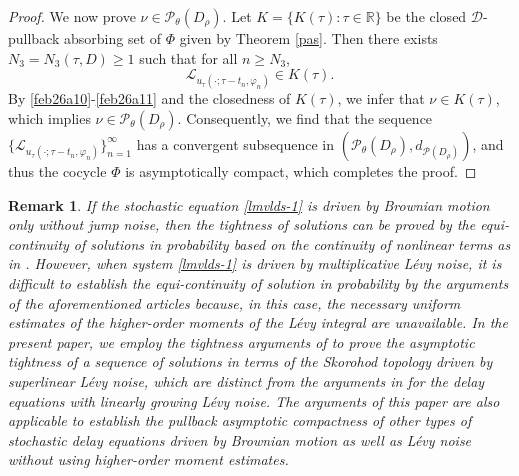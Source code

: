\documentclass[11pt]{article}
\numberwithin{equation}{section}
\theoremstyle{plain}
\newtheorem{remark}{Remark}[section]
\newcommand{\R}{\mathbb{R}}
\def \cald {{  {\mathcal{D}}  }}
\def\be{\begin{equation}}
\def\ee{\end{equation}}
\begin{document}
\begin{proof}
We now prove   $\nu \in \mathcal{P}_\theta (D_\rho)$.
 Let $K=\{K(\tau): \tau \in \R \}$
 be the closed $\cald$-pullback
 absorbing set of $\Phi$ given by 
 Theorem \ref{pas}.
  Then there exists
 $N_3=N_3 (\tau, D) \ge 1$ such that for all
 $n\ge N_3$,
 \be\label{feb26a11}
 \mathcal{L}_{  u_\tau (\cdot; \tau -t_n, \varphi_n)}
 \in  K(\tau).
\ee
By \eqref{feb26a10}-\eqref{feb26a11}
and the closedness of 
 $K(\tau)$,   we infer that 
  $\nu \in K(\tau)$,
  which implies 
 $\nu \in \mathcal{P}_\theta (D_\rho)$.
Consequently, we find that
the sequence
$\{\mathcal{L}_{
       u _\tau  ( \cdot; \tau - t_n,  \varphi_n   )  }
       \}_{n=1}^\infty$
       has a convergent subsequence
       in  $(\mathcal{P}_{\theta}(D_{\rho}), d_{\mathcal{P}(D_{\rho})})$,
       and thus the cocycle $\Phi$
       is asymptotically compact,
       which completes the proof.
 \end{proof}





  
 \begin{remark}
   If the stochastic equation
    \eqref{lmvlds-1} is   driven by Brownian motion
    only without jump noise, 
    then the tightness of solutions can be 
    proved  by the equi-continuity 
    of solutions in probability
    based on 
    the  continuity 
    of nonlinear terms 
     as in \cite{CWZ2025JNS, wwm2019SCL, ll2022DCDSB, csw2025PRSEA}. 
     However, 
    when  system  \eqref{lmvlds-1} 
    is driven by  multiplicative L\'{e}vy noise,
    it is difficult
    to establish the equi-continuity 
    of solution in probability
    by 
  the arguments
  of the aforementioned articles
  because, in this case,
  the necessary
  uniform estimates
  of the  higher-order moments of 
  the L\'{e}vy integral are unavailable.
   In the present paper,
   we employ  the tightness
   arguments of  \cite{J1986AIHP, A1978AOP} to 
   prove the asymptotic
   tightness of  a sequence of solutions in
   terms of the  Skorohod
   topology    driven by superlinear L\'{e}vy noise, 
  which  are   distinct from 
  the arguments  in \cite{RRG2006SPA, bc2016Stoch} 
  for the  delay   equations with linearly
  growing   L\'{e}vy noise. 
  The arguments of this paper are 
 also applicable  
 to establish the 
  pullback asymptotic compactness
  of 
 other types
   of stochastic delay equations driven by Brownian motion 
   as well as   L\'{e}vy noise  
    without using higher-order moment estimates.
 \end{remark}
 
\end{document}
